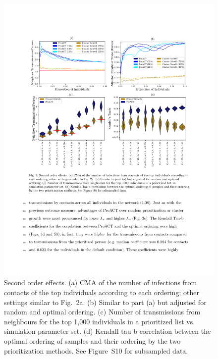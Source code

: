 \documentclass[a4paper,11pt]{article}
\newcommand{\PLWH}{sample\xspace}
\begin{document}
\begin{figure}[!t]
\centering
\includegraphics[width=\textwidth]{figs/Fig3.pdf}
\caption{Second order effects. 
(a) CMA of the number of infections from contacts of the top individuals according to each ordering; other settings similar to Fig.~2a. (b)
Similar to  part (a) but adjusted for random and optimal ordering.
(c)
Number of transmissions from neighbours for the top 1,000 individuals  in a prioritized list vs. simulation parameter set.
 (d) 
 Kendall tau-b correlation between the optimal ordering of \PLWH{s}  and their ordering by the two prioritization methods.
 See Figure~S10 for subsampled data. 
 }
\label{fig:efficacy-neighbors}
\end{figure}
\end{document}
